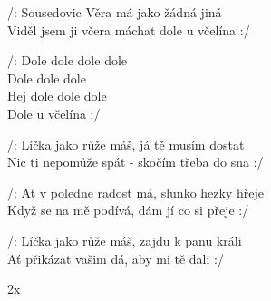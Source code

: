
\ve{}
/: Sousedovic Věra má jako žádná jiná\\
Viděl jsem ji včera máchat dole u včelína :/
  
\cho{}
/: Dole dole dole dole\\
Dole dole dole\\
Hej dole dole dole\\
Dole u včelína :/

\ve{}
/: Líčka jako růže máš, já tě musím dostat\\
Nic ti nepomůže spát - skočím třeba do sna :/

\cho{}

\ve{}
/: Ať v poledne radost má, slunko hezky hřeje\\
Když se na mě podívá, dám jí co si přeje :/

\cho{}

\ve{}   
/: Líčka jako růže máš, zajdu k panu králi\\
Ať přikázat vašim dá, aby mi tě dali :/

\cho{}2x
\esong